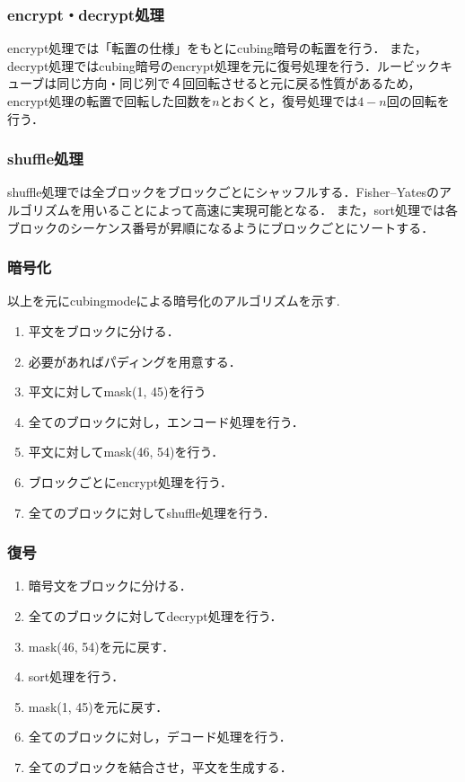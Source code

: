 \documentclass[titlepage]{jarticle}
\begin{document}
\subsubsection{encrypt・decrypt処理}
encrypt処理では「転置の仕様」をもとにcubing暗号の転置を行う．
また，decrypt処理ではcubing暗号のencrypt処理を元に復号処理を行う．ルービックキューブは同じ方向・同じ列で４回回転させると元に戻る性質があるため，encrypt処理の転置で回転した回数を\(n\)とおくと，復号処理では\(4-n\)回の回転を行う．

\subsubsection{shuffle処理}
shuffle処理では全ブロックをブロックごとにシャッフルする．Fisher–Yatesのアルゴリズムを用いることによって高速に実現可能となる．
また，sort処理では各ブロックのシーケンス番号が昇順になるようにブロックごとにソートする．

\subsubsection{暗号化}
以上を元にcubingmodeによる暗号化のアルゴリズムを示す. 
\begin{screen}
  \begin{enumerate}
    \item 平文をブロックに分ける．
    \item 必要があればパディングを用意する．
    \item 平文に対してmask(\hspace{1.8mm}1, 45)を行う
    \item 全てのブロックに対し，エンコード処理を行う．
    \item 平文に対してmask(46, 54)を行う．
    \item ブロックごとにencrypt処理を行う．
    \item 全てのブロックに対してshuffle処理を行う．
  \end{enumerate}
\end{screen}

\subsubsection{復号}
\begin{screen}
  \begin{enumerate}
    \item 暗号文をブロックに分ける．
    \item 全てのブロックに対してdecrypt処理を行う．
    \item mask(46, 54)を元に戻す．
    \item sort処理を行う．
    \item mask(\hspace{1.8mm}1, 45)を元に戻す．
    \item 全てのブロックに対し，デコード処理を行う．
    \item 全てのブロックを結合させ，平文を生成する．
  \end{enumerate}
\end{screen}
\end{document}
